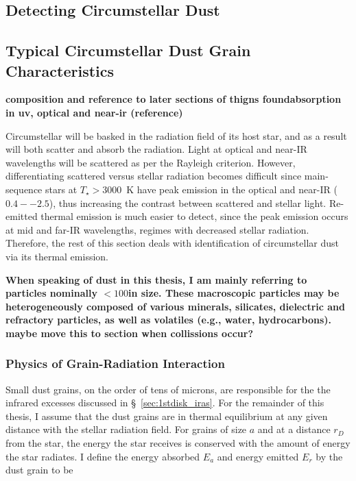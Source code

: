   
    \subsection{Detecting Circumstellar Dust}\label{sec:excess_detection}

        \subsection{Typical Circumstellar Dust Grain Characteristics}            
            
        \textbf{composition and reference to later sections of thigns foundabsorption in uv, optical and near-ir (reference)}
        
        
                    
        Circumstellar will be basked in the radiation field of its host star, and as a result will both scatter and absorb the radiation. Light at optical and near-IR wavelengths will be scattered as per the Rayleigh criterion. However, differentiating scattered versus stellar radiation becomes difficult since main-sequence stars at $T_\star>3000$~K have peak emission in the optical and near-IR ($0.4--2.5$\micron), thus increasing the contrast between scattered and stellar light. Re-emitted thermal emission is much easier to detect, since the peak emission occurs at mid and far-IR wavelengths, regimes with decreased stellar radiation. Therefore, the rest of this section deals with identification of circumstellar dust via its thermal emission.  
        
        
        \textbf{When speaking of dust in this thesis, I am mainly referring to particles nominally $<100$\micron in size. These macroscopic particles may be heterogeneously composed of various minerals, silicates, dielectric and refractory particles, as well as volatiles (e.g., water, hydrocarbons).  maybe move this to section when collissions occur?}
        
        \subsubsection{Physics of Grain-Radiation Interaction}            
            
            Small dust grains, on the order of tens of microns, are responsible for the the infrared excesses discussed in \S~\ref{sec:1stdisk_iras}. For the remainder of this thesis, I assume that the dust grains are in thermal equilibrium at any given distance with the stellar radiation field. %
            For grains of size $a$ and at a distance $r_D$ from the star, the energy the star receives is conserved with the amount of energy the star radiates. I define the energy absorbed $E_{a}$ and energy emitted $E_{r}$ by the dust grain to be
            
